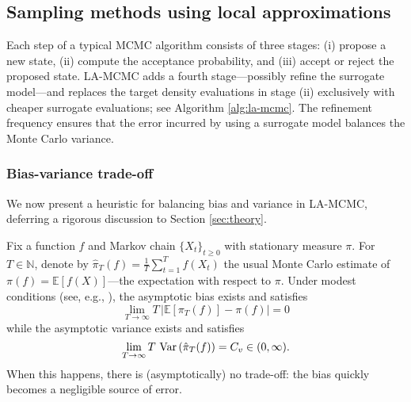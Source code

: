 \subsection{Sampling methods using local approximations}

Each step of a typical MCMC algorithm consists of three stages: (i) propose a new state, (ii) compute the acceptance probability, and (iii) accept or reject the proposed state. LA-MCMC adds a fourth stage---possibly refine the surrogate model---and replaces the target density evaluations in stage (ii) exclusively with cheaper surrogate evaluations; see Algorithm \ref{alg:la-mcmc}. The refinement frequency ensures that the error incurred by using a surrogate model balances the Monte Carlo variance.

\subsubsection{Bias-variance trade-off} \label{sec:bias-variance-trade-off}

We now present a heuristic for balancing bias and variance in LA-MCMC,  deferring a rigorous discussion to Section \ref{sec:theory}.

Fix a function $f$ and Markov chain $\{X_{t}\}_{t \geq 0}$ with stationary measure $\pi$. For $T \in \mathbb{N}$, denote by $\hat{\pi}_{T}(f) = \frac{1}{T} \sum_{t=1}^{T} f(X_{t})$ the usual Monte Carlo estimate of $\pi(f) = \mathbb{E}[f(X)]$---the expectation with respect to $\pi$. 
Under modest conditions (see, e.g.,  \citet{meyn2012markov}), the asymptotic bias exists and satisfies 
\begin{equation}
\lim_{T \rightarrow \infty} T \, \left \vert \mathbb{E}[\pi_{T}(f)] - \pi(f) \right \vert = 0
\end{equation}
while the asymptotic variance exists and satisfies
\begin{equation}
\lim_{T \rightarrow \infty} T \, \operatorname*{Var}{(\hat{\pi}_{T}(f))}  = C_v \in (0,\infty).
\end{equation}
When this happens, there is (asymptotically) no trade-off: the bias quickly becomes a negligible source of error.

